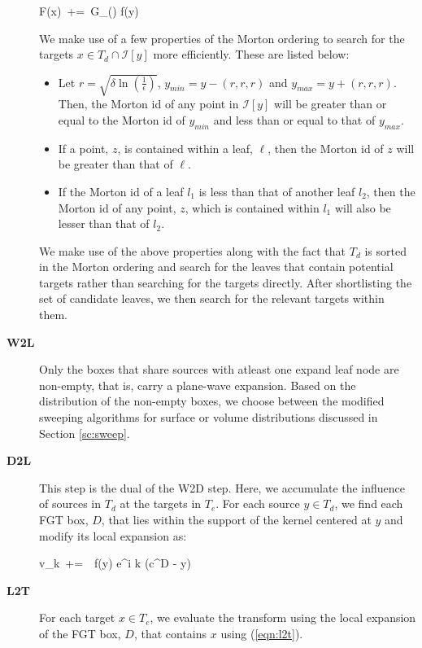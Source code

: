 \begin{description}
\beq F(x) \,+=\, G_\delta() f(y) \label{eqn:d2d} \eeq

We make use of a few properties of the Morton ordering to search for the targets $x \in T_d \cap \mathcal{I}[y]$ more efficiently. These
are listed below:
\begin{itemize}
\item Let $r = \sqrt{\delta \ln (\frac{1}{\epsilon})}$, $y_{min} = y - (r, r, r)$ and $y_{max} = y + (r, r, r)$. Then, the Morton id of any point in $\mathcal{I}[y]$ will be greater than or equal to the Morton id of $y_{min}$ and less than or equal to that of $y_{max}$.
\item If a point, $z$, is contained within a leaf, $\ell$, then the Morton id of $z$ will be greater than that of $\ell$.
\item If the Morton id of a leaf $l_1$ is less than that of another leaf $l_2$, then the Morton id of any point, $z$, which is
 contained within $l_1$ will also be lesser than that of $l_2$.
\end{itemize}

 We make use of the above properties along with the fact that $T_d$ is sorted in the Morton ordering and
 search for the leaves that contain potential targets rather than searching for the targets directly. After
 shortlisting the set of candidate leaves, we then search for the relevant targets within them.

\item[\textbf{W2L}] Only the boxes that share sources with atleast one expand leaf node are non-empty, that is,
 carry a plane-wave expansion. Based on the distribution of the non-empty boxes, we choose between the modified sweeping
 algorithms for surface or volume distributions discussed in Section \ref{sc:sweep}. 

\item[\textbf{D2L}] This step is the dual of the W2D step. Here, we accumulate the influence of sources 
in $T_d$ at the targets in $T_e$. For each source $y \in T_d$, we find each FGT box, $D$, that lies within
 the support of the kernel centered at $y$ and modify its local expansion as: 

\beq v_k  \,+=\, \, f(y) e^{i \lambda k \cdot (c^D - y)} \label{eqn:d2l} \eeq

\item[\textbf{L2T}] For each target $x \in T_e$, we evaluate the transform using the local 
expansion of the FGT box, $D$, that contains $x$ using (\ref{eqn:l2t}).
\end{description}



